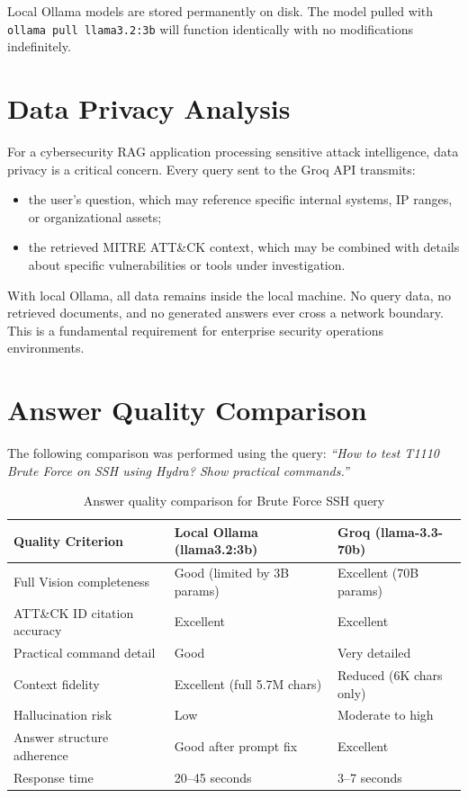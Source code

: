 \documentclass[12pt,a4paper]{report}
\newcommand{\ATTACK}{MITRE ATT\&CK}
\begin{document}
Local Ollama models are stored permanently on disk. The model pulled with \texttt{ollama pull llama3.2:3b} will function identically with no modifications indefinitely.

\section{Data Privacy Analysis}

For a cybersecurity RAG application processing sensitive attack intelligence, data privacy is a critical concern. Every query sent to the Groq API transmits:

\begin{itemize}
    \item the user's question, which may reference specific internal systems, IP ranges, or organizational assets;
    \item the retrieved \ATTACK{} context, which may be combined with details about specific vulnerabilities or tools under investigation.
\end{itemize}

With local Ollama, all data remains inside the local machine. No query data, no retrieved documents, and no generated answers ever cross a network boundary. This is a fundamental requirement for enterprise security operations environments.

\section{Answer Quality Comparison}

The following comparison was performed using the query: \textit{``How to test T1110 Brute Force on SSH using Hydra? Show practical commands.''}

\begin{table}[H]
\centering
\begin{tabularx}{\textwidth}{lXX}
\toprule
\textbf{Quality Criterion} & \textbf{Local Ollama (llama3.2:3b)} & \textbf{Groq (llama-3.3-70b)} \\
\midrule
Full Vision completeness & Good (limited by 3B params) & Excellent (70B params) \\
ATT\&CK ID citation accuracy & Excellent & Excellent \\
Practical command detail & Good & Very detailed \\
Context fidelity & Excellent (full 5.7M chars) & Reduced (6K chars only) \\
Hallucination risk & Low & Moderate to high \\
Answer structure adherence & Good after prompt fix & Excellent \\
Response time & 20--45 seconds & 3--7 seconds \\
\bottomrule
\end{tabularx}
\caption{Answer quality comparison for Brute Force SSH query}
\label{tab:quality_compare}
\end{table}
\end{document}
